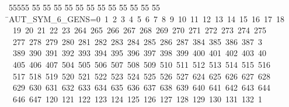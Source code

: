 %
%
\begin{tabbing}
55555 \= 55 \= 55 \= 55 \= 55 \= 55 \= 55 \= 55 \= 55 \= 55 \= 55 \= 55 \= 55 \= \>AUT\_SYM\_6\_GENS=0\ 1\ 2\ 3\ 4\ 5\ 6\ 7\ 8\ 9\ 10\ 11\ 12\ 13\ 14\ 15\ 16\ 17\ 18\\[0pt]
\>\ 19\ 20\ 21\ 22\ 23\ 264\ 265\ 266\ 267\ 268\ 269\ 270\ 271\ 272\ 273\ 274\ 275\ \\[0pt]
\ 277\ 278\ 279\ 280\ 281\ 282\ 283\ 284\ 285\ 286\ 287\ 384\ 385\ 386\ 387\ 3\\[0pt]
\ 389\ 390\ 391\ 392\ 393\ 394\ 395\ 396\ 397\ 398\ 399\ 400\ 401\ 402\ 403\ 40\\[0pt]
\ 405\ 406\ 407\ 504\ 505\ 506\ 507\ 508\ 509\ 510\ 511\ 512\ 513\ 514\ 515\ 516\\[0pt]
\>\ 517\ 518\ 519\ 520\ 521\ 522\ 523\ 524\ 525\ 526\ 527\ 624\ 625\ 626\ 627\ 628\\[0pt]
\>\ 629\ 630\ 631\ 632\ 633\ 634\ 635\ 636\ 637\ 638\ 639\ 640\ 641\ 642\ 643\ 644\ \\[0pt]
\ 646\ 647\ 120\ 121\ 122\ 123\ 124\ 125\ 126\ 127\ 128\ 129\ 130\ 131\ 132\ 1\\[0pt]

\end{tabbing}

